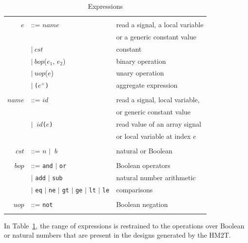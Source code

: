 \documentclass[pdflatex,sn-mathphys]{sn-jnl}%
\theoremstyle{thmstyleone}%
\theoremstyle{thmstyletwo}%
\theoremstyle{thmstylethree}%
\begin{document}
\begin{table}[!t]
  \caption{Expressions}
  \label{tab:expr}
  \begin{tabular}{|rll|}
    \hline
    & & \\
    $e$ & ::= $name$ & read a signal, a local variable \\
    & & or a generic constant value \\
    & \quad $\vert{}~cst$ & constant \\
    & \quad $\vert{}~bop$($e_1$, $e_2$) & binary operation \\
    & \quad $\vert{}~uop$($e$) & unary operation \\
    & \quad $\vert{}~$\texttt{(}$e^{+}$\texttt{)} & aggregate expression \\
    & & \\
    $name$ & ::= $id$ & read a signal, local variable, \\
    & & or generic constant value \\
    & \quad$\vert{}~$ $id$\texttt{(}$e$\texttt{)} & read value of an array signal  \\
    & & or local variable at index $e$ \\
    & & \\
    $cst$ & ::= $n$ $\vert{}~$ $b$ & natural or Boolean \\
    & & \\
    $bop$ & ::= \texttt{and} $\vert{}$ \texttt{or} & Boolean operators \\
    & \quad$\vert{}$ \texttt{add} $\vert{}$ \texttt{sub} & natural number arithmetic \\
    & \quad$\vert{}$ \texttt{eq} $\vert{}$ \texttt{ne} $\vert{}$ \texttt{gt} $\vert{}$ \texttt{ge} $\vert{}$ \texttt{lt} $\vert{}$ \texttt{le} & comparisons \\
    & & \\
    $uop$ & ::= \texttt{not} & Boolean negation \\
    & & \\
    \hline
  \end{tabular}
\end{table}

In Table~\ref{tab:expr}, the range of expressions is restrained to the
operations over Boolean or natural numbers that are present in the
designs generated by the HM2T.
\end{document}
